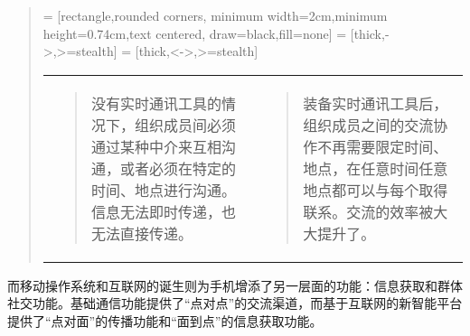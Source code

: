             \begin{quotation}
                 = [rectangle,rounded corners, minimum width=2cm,minimum height=0.74cm,text centered, draw=black,fill=none]
                 = [thick,->,>=stealth]
                 = [thick,<->,>=stealth]

                \noindent\begin{tabularx}{\linewidth}{AA}
                    \begin{quotation}
                        没有实时通讯工具的情况下，组织成员间必须通过某种中介来互相沟通，或者必须在特定的时间、地点进行沟通。信息无法即时传递，也无法直接传递。
                    \end{quotation}
                    &
                    \begin{quotation}
                        装备实时通讯工具后，组织成员之间的交流协作不再需要限定时间、地点，在任意时间任意地点都可以与每个取得联系。交流的效率被大大提升了。
                    \end{quotation}
                    \\
                \end{tabularx}
            \end{quotation}
            而移动操作系统和互联网的诞生则为手机增添了另一层面的功能：信息获取和群体社交功能。基础通信功能提供了“点对点”的交流渠道，而基于互联网的新智能平台提供了“点对面”的传播功能和“面到点”的信息获取功能。
            

